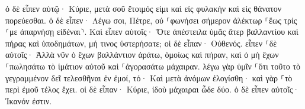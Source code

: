 \documentclass{openreader}
\begin{document}
ὁ δὲ εἶπεν αὐτῷ· Κύριε, μετὰ σοῦ ἕτοιμός εἰμι καὶ εἰς φυλακὴν καὶ εἰς θάνατον πορεύεσθαι. 
ὁ δὲ εἶπεν· Λέγω σοι, Πέτρε, οὐ ⸀φωνήσει σήμερον ἀλέκτωρ ⸀ἕως τρίς ⸂με ἀπαρνήσῃ εἰδέναι⸃. 
Καὶ εἶπεν αὐτοῖς· Ὅτε ἀπέστειλα ὑμᾶς ἄτερ βαλλαντίου καὶ πήρας καὶ ὑποδημάτων, μή τινος ὑστερήσατε; οἱ δὲ εἶπαν· Οὐθενός. 
εἶπεν ⸀δὲ αὐτοῖς· Ἀλλὰ νῦν ὁ ἔχων βαλλάντιον ἀράτω, ὁμοίως καὶ πήραν, καὶ ὁ μὴ ἔχων ⸀πωλησάτω τὸ ἱμάτιον αὐτοῦ καὶ ⸀ἀγορασάτω μάχαιραν. 
λέγω γὰρ ὑμῖν ⸀ὅτι τοῦτο τὸ γεγραμμένον δεῖ τελεσθῆναι ἐν ἐμοί, τό· Καὶ μετὰ ἀνόμων ἐλογίσθη· καὶ γὰρ ⸀τὸ περὶ ἐμοῦ τέλος ἔχει. 
οἱ δὲ εἶπαν· Κύριε, ἰδοὺ μάχαιραι ὧδε δύο. ὁ δὲ εἶπεν αὐτοῖς· Ἱκανόν ἐστιν. 
\end{document}
